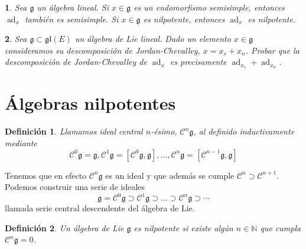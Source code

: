 \documentclass[a4paper,draft,12pt]{scrartcl}
\newtheorem{defi}{Definición}[section]%
\newtheorem{pro1}{}%
\newenvironment{pro}{\begin{pro1} \rm} {\end{pro1}}
\newcommand{\N}{\mathbb{N}}%
\newcommand{\g}{\mathfrak{g}}%
\newcommand{\central}{\mathcal{C}}%
\newcommand{\df}[1]{\textsf{\color{blue}#1}}
\DeclareMathOperator{\ad}{ad}  %
\begin{document}
\begin{pro}

Sea  $\g$ un álgebra lineal. Si $x\in \g$ es un endomorfismo semisimple, entonces $\ad_x$ también es semisimple.
Si $x\in \g$ es nilpotente, entonces $\ad_x$ es nilpotente.

\end{pro}




\begin{pro}

Sea $\g \subset \mathfrak{gl}(E)$ un  álgebra de Lie lineal.  Dado un elemento $x \in \g$ consideramos su descomposición de Jordan-Chevalley, $x= x_s+x_n$.  Probar que la descomposición de Jordan-Chevalley de $\ad_x$ es precisamente $\ad_{x_s}+ \ad_{x_n}$.

\end{pro}

\newpage

\section{Álgebras nilpotentes}

\begin{defi}

Llamamos  \df{ideal central}  $n$-ésimo, $\central^n \g$, al definido inductivamente mediante
$$
\central^0\g=\g, \central^1\g =[\central^0\g,\g], \dots, \central^n \g= [\central^{n-1}\g,\g]
$$

\end{defi}

Tenemos que en efecto $\central^n \g$ es un ideal y que además se cumple $\central^n \supset \central^{n+1}$.  Podemos construir una serie de ideales
$$
\g = \central^0\g\supset \central^1 \g \supset \dots \supset \central^n\g\supset \cdots
$$
llamada  \df{serie central descendente}  del álgebra de Lie.




\begin{defi}

Un álgebra de Lie $\g$ es nilpotente  si existe algún $n \in \N$ que cumpla $\central^n\g=0$. 

\end{defi}


\end{document}
